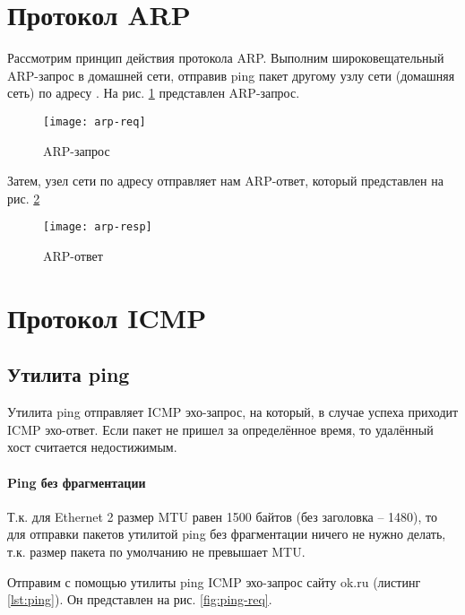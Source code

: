 

\section{Протокол ARP}

Рассмотрим принцип действия протокола ARP. Выполним широковещательный ARP-запрос в домашней сети, отправив ping пакет другому узлу сети (домашняя сеть) по адресу .  На рис. \ref{fig:arp-req} представлен ARP-запрос.

\begin{figure}[H]
	\centering
	\texttt{[image: arp-req]}
	\caption{ARP-запрос}
	\label{fig:arp-req}
\end{figure}

Затем, узел сети по адресу  отправляет нам ARP-ответ, который представлен на рис. \ref{fig:arp-resp}

\begin{figure}[H]
	\centering
	\texttt{[image: arp-resp]}
	\caption{ARP-ответ}
	\label{fig:arp-resp}
\end{figure}

\section{Протокол ICMP}

\subsection{Утилита ping}

Утилита ping отправляет ICMP эхо-запрос, на который, в случае успеха приходит ICMP эхо-ответ. Если пакет не пришел за определённое время, то удалённый хост считается недостижимым.

\paragraph{Ping без фрагментации}

Т.к. для Ethernet 2 размер MTU равен 1500 байтов (без заголовка -- 1480), то для отправки пакетов утилитой ping без фрагментации ничего не нужно делать, т.к. размер пакета по умолчанию не превышает MTU.

Отправим с помощью утилиты ping ICMP эхо-запрос сайту ok.ru (листинг \ref{lst:ping}). Он представлен на рис. \ref{fig:ping-req}.

